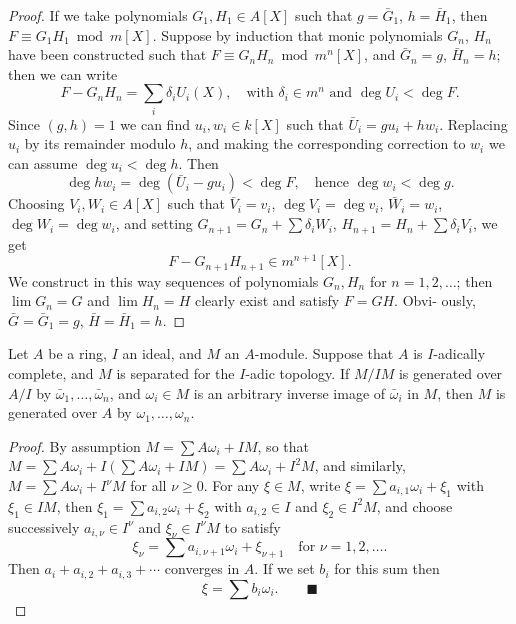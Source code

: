 \begin{proof}
If we take polynomials $G_1, H_1 \in A[X]$ such that $g = \bar{G}_1$, $h = \bar{H}_1$, then
$F \equiv G_1H_1 \bmod m[X]$. Suppose by induction that monic polynomials $G_n$,
$H_n$ have been constructed such that $F \equiv G_nH_n \bmod m^n[X]$, and $\bar{G}_n = g$,
$\bar{H}_n = h$; then we can write
\[
  F - G_nH_n = \sum_i \delta_iU_i(X), \quad \text{with } \delta_i \in m^n \text{ and } \deg U_i < \deg F.
\]
Since $(g, h) = 1$ we can find $u_i, w_i \in k[X]$ such that $\bar{U}_i = gu_i + hw_i$. Replacing
$u_i$ by its remainder modulo $h$, and making the corresponding correction to
$w_i$ we can assume $\deg u_i < \deg h$. Then
\[
  \deg hw_i = \deg(\bar{U}_i - gu_i) < \deg F, \quad \text{hence } \deg w_i < \deg g.
\]
Choosing $V_i, W_i \in A[X]$ such that $\bar{V}_i = v_i$, $\deg V_i = \deg v_i$, $\bar{W}_i = w_i$,
$\deg W_i = \deg w_i$, and setting $G_{n+1} = G_n + \sum \delta_iW_i$, $H_{n+1} = H_n + \sum \delta_i V_i$,
we get
\[
  F - G_{n+1}H_{n+1} \in m^{n+1}[X].
\]
We construct in this way sequences of polynomials $G_n, H_n$ for $n = 1, 2, \ldots$;
then $\lim G_n = G$ and $\lim H_n = H$ clearly exist and satisfy $F = GH$. Obvi-
ously, $\bar{G} = \bar{G}_1 = g$, $\bar{H} = \bar{H}_1 = h$.
\end{proof}

\begin{theorem}\label{thm:8.4}
Let $A$ be a ring, $I$ an ideal, and $M$ an $A$-module. Suppose
that $A$ is $I$-adically complete, and $M$ is separated for the $I$-adic topology. If
$M/IM$ is generated over $A/I$ by $\bar{\omega}_1, \ldots, \bar{\omega}_n$, and $\omega_i \in M$ is an arbitrary
inverse image of $\bar{\omega}_i$ in $M$, then $M$ is generated over $A$ by $\omega_1, \ldots, \omega_n$.
\end{theorem}

\begin{proof}
By assumption $M = \sum A\omega_i + IM$, so that $M = \sum A\omega_i + I(\sum A\omega_i +
IM) = \sum A\omega_i + I^2M$, and similarly, $M = \sum A\omega_i + I^\nu M$ for all $\nu \ge 0$. For
any $\xi \in M$, write $\xi = \sum a_{i,1}\omega_i + \xi_1$ with $\xi_1 \in IM$, then $\xi_1 = \sum a_{i,2}\omega_i + \xi_2$ with
$a_{i,2} \in I$ and $\xi_2 \in I^2M$, and choose successively $a_{i,\nu} \in I^\nu$ and $\xi_\nu \in I^\nu M$ to satisfy
\[
  \xi_\nu = \sum a_{i,\nu+1}\omega_i + \xi_{\nu+1} \quad \text{for } \nu = 1, 2, \ldots.
\]
Then $a_i + a_{i,2} + a_{i,3} + \cdots$ converges in $A$. If we set $b_i$ for this sum then
\[
  \xi = \sum b_i\omega_i. \qquad\blacksquare
\]
\end{proof}

